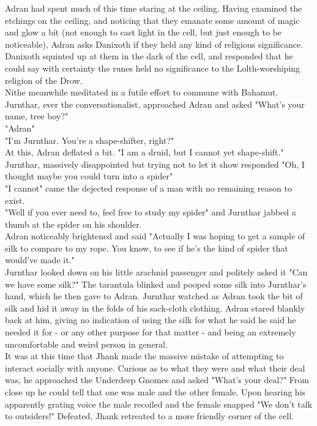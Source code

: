 \documentclass[letterpaper,10pt,twoside,twocolumn,openany]{book}
\begin{document}
Adran had spent much of this time staring at the ceiling. Having examined the etchings on the ceiling, and noticing that they emanate some amount of magic and glow a bit (not enough to cast light in the cell, but just enough to be noticeable), Adran asks Danixoth if they held any kind of religious significance. Danixoth squinted up at them in the dark of the cell, and responded that he could say with certainty the runes held no significance to the Lolth-worshiping religion of the Drow.\\

Nithe meanwhile meditated in a futile effort to commune with Bahamut.\\

Jurnthar, ever the conversationalist, approached Adran and asked "What's your name, tree boy?"\\
"Adran"\\
"I'm Jurnthar. You're a shape-shifter, right?"\\
At this, Adran deflated a bit. "I am a druid, but I cannot yet shape-shift."\\
Jurnthar, massively disappointed but trying not to let it show responded "Oh, I thought maybe you could turn into a spider"\\
"I cannot" came the dejected response of a man with no remaining reason to exist.\\
"Well if you ever need to, feel free to study my spider" and Jurnthar jabbed a thumb at the spider on his shoulder.\\
Adran noticeably brightened and said "Actually I was hoping to get a sample of silk to compare to my rope. You know, to see if he's the kind of spider that would've made it."\\
Jurnthar looked down on his little arachnid passenger and politely asked it "Can we have some silk?" The tarantula blinked and pooped some silk into Jurnthar's hand, which he then gave to Adran.
Jurnthar watched as Adran took the bit of silk and hid it away in the folds of his sack-cloth clothing. Adran stared blankly back at him, giving no indication of using the silk for what he said he said he needed it for - or any other purpose for that matter - and being an extremely uncomfortable and weird person in general.\\

It was at this time that Jhank made the massive mistake of attempting to interact socially with anyone. Curious as to what they were and what their deal was, he approached the Underdeep Gnomes and asked "What's your deal?"
From close up he could tell that one was male and the other female. Upon hearing his apparently grating voice the male recoiled and the female snapped "We don't talk to outsiders!" Defeated, Jhank retreated to a more friendly corner of the cell.\\
\end{document}
